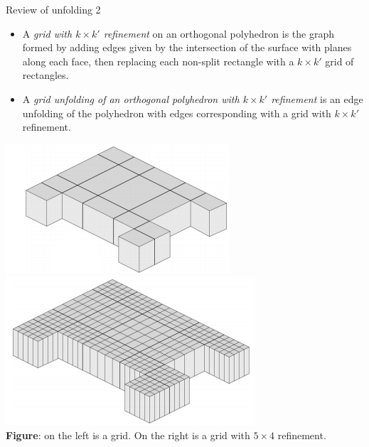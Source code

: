 \documentclass{beamer}
\theoremstyle{plain}
\begin{document}
  \begin{frame}{Review of unfolding 2}
    \begin{itemize}
      \item A \emph{grid with $k \times k'$ refinement} on an orthogonal polyhedron is the graph formed by adding edges given by the intersection of the surface with planes along each face, then replacing each non-split rectangle with a $k \times k'$ grid of rectangles.
      \pause \item A \emph{grid unfolding of an orthogonal polyhedron with $k \times k'$ refinement} is an edge unfolding of the polyhedron with edges corresponding with a grid with $k \times k'$ refinement. 
    \end{itemize}
    \begin{center}
    \includegraphics[width=.3\textwidth]{./figs/grid.png}
    \hspace{.1\textwidth}
    \includegraphics[width=.3\textwidth]{./figs/refined_grid.png}\\
    \tiny\textbf{Figure}: on the left is a grid. On the right is a grid with $5 \times 4$ refinement.
    \end{center}
  \end{frame}
\end{document}
